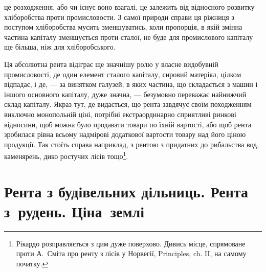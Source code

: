 \parcont{}  %
це розходження, або чи існує воно взагалі, це залежить від відносного розвитку хліборобства
проти промисловости. З самої природи справи ця ріжниця з поступом
хліборобства мусить зменшуватись, коли пропорція, в якій змінна частина
капіталу зменшується проти сталої, не буде для промислового капіталу ще
більша, ніж для хліборобського.

Ця абсолютна рента відіграє ще значнішу ролю у власне видобувній
промисловості, де один елемент сталого капіталу, сировий матеріял, цілком відпадає,
і де, — за винятком галузей, в яких частина, що складається з машин і
іншого основного капіталу, дуже значна, — безумовно переважає найнижчий
склад капіталу. Якраз тут, де видається, що рента завдячує своїм походженням
виключно монопольній ціні, потрібні екстраординарно сприятливі ринкові відносини,
щоб можна було продавати товари по їхній вартості, або щоб рента
зробилася рівна всьому надмірові додаткової вартости товару над його ціною
продукції. Так стоїть справа наприклад, з рентою з придатних до рибальства
вод, каменярень, дико ростучих лісів тощо\footnote{
Рікардо розправляється з цим дуже поверхово. Дивись місце, спрямоване проти А.~Сміта
про ренту з лісів у Норвегії, Principles, ch. II, на самому початку.
}.

\section{Рента з будівельних дільниць. Рента з~рудень. Ціна~землі}

